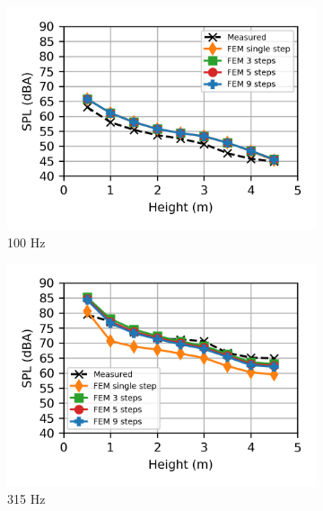 \begin{figure}[H]
	\centering
	\begin{subfigure}[b]{0.49\textwidth}
		\centering
		\includegraphics{fig/chap5/freq_steps/third_octave_over_height/100_Hz.png}
		\caption{100 Hz}
	\end{subfigure}
	\hfill
	\begin{subfigure}[b]{0.49\textwidth}
		\centering
		\includegraphics{fig/chap5/freq_steps/third_octave_over_height/315_Hz.png}
		\caption{315 Hz}
	\end{subfigure}
	\\
	\begin{subfigure}[b]{0.49\textwidth}
		\centering

\end{subfigure}
\end{figure}
